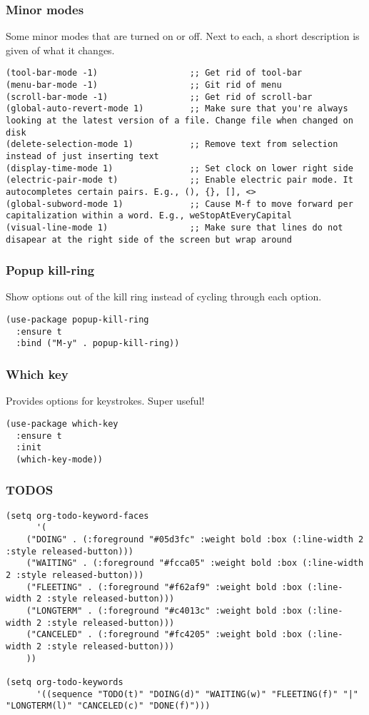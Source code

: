 \documentclass[11pt]{article}
\begin{document}
\subsubsection{Minor modes}
\label{sec:org7e37497}
Some minor modes that are turned on or off. Next to each, a short description is given of what it changes.
\begin{verbatim}
(tool-bar-mode -1)                  ;; Get rid of tool-bar
(menu-bar-mode -1)                  ;; Git rid of menu
(scroll-bar-mode -1)                ;; Get rid of scroll-bar
(global-auto-revert-mode 1)         ;; Make sure that you're always looking at the latest version of a file. Change file when changed on disk
(delete-selection-mode 1)           ;; Remove text from selection instead of just inserting text
(display-time-mode 1)               ;; Set clock on lower right side
(electric-pair-mode t)              ;; Enable electric pair mode. It autocompletes certain pairs. E.g., (), {}, [], <>
(global-subword-mode 1)             ;; Cause M-f to move forward per capitalization within a word. E.g., weStopAtEveryCapital
(visual-line-mode 1)                ;; Make sure that lines do not disapear at the right side of the screen but wrap around
\end{verbatim}
\subsubsection{Popup kill-ring}
\label{sec:org520de0b}
Show options out of the kill ring instead of cycling through each option.
\begin{verbatim}
(use-package popup-kill-ring
  :ensure t
  :bind ("M-y" . popup-kill-ring))
\end{verbatim}
\subsubsection{Which key}
\label{sec:orga8f837c}
Provides options for keystrokes. Super useful!
\begin{verbatim}
(use-package which-key
  :ensure t
  :init
  (which-key-mode))
\end{verbatim}
\subsubsection{TODOS}
\label{sec:orga5c37b5}
\begin{verbatim}
(setq org-todo-keyword-faces
      '(
	("DOING" . (:foreground "#05d3fc" :weight bold :box (:line-width 2 :style released-button)))
	("WAITING" . (:foreground "#fcca05" :weight bold :box (:line-width 2 :style released-button)))
	("FLEETING" . (:foreground "#f62af9" :weight bold :box (:line-width 2 :style released-button)))
	("LONGTERM" . (:foreground "#c4013c" :weight bold :box (:line-width 2 :style released-button)))
	("CANCELED" . (:foreground "#fc4205" :weight bold :box (:line-width 2 :style released-button)))
	))

(setq org-todo-keywords
      '((sequence "TODO(t)" "DOING(d)" "WAITING(w)" "FLEETING(f)" "|" "LONGTERM(l)" "CANCELED(c)" "DONE(f)")))
\end{verbatim}
\end{document}
